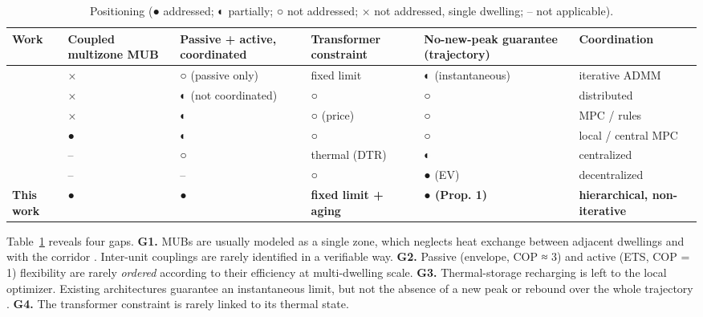 \documentclass[conference]{IEEEtran}
\begin{document}
\begin{table}[tb]
\centering\footnotesize
\caption{Positioning (● addressed; ◐ partially; ○ not addressed; × not addressed, single dwelling; -- not applicable).}\label{tab:I}
\begin{tabular}{>{\raggedright\arraybackslash}p{}>{\raggedright\arraybackslash}p{}>{\raggedright\arraybackslash}p{}>{\raggedright\arraybackslash}p{}>{\raggedright\arraybackslash}p{}>{\raggedright\arraybackslash}p{}}
\toprule
\textbf{Work} & \textbf{Coupled multizone MUB} & \textbf{Passive + active, coordinated} & \textbf{Transformer constraint} & \textbf{No-new-peak guarantee (trajectory)} & \textbf{Coordination} \\
\midrule
\cite{Etedadi2023} & × & ○ (passive only) & fixed limit & ◐ (instantaneous) & iterative ADMM \\
\cite{EtedadiAliabadi2022} & × & ◐ (not coordinated) & ○ & ○ & distributed \\
\cite{Vallianos2023, Morovat2022} & × & ◐ & ○ (price) & ○ & MPC / rules \\
\cite{Frahm2025, Hasrat2025} & ● & ◐ & ○ & ○ & local / central MPC \\
\cite{Daminov2021} & -- & ○ & thermal (DTR) & ◐ & centralized \\
\cite{Gan2013} & -- & -- & ○ & ● (EV) & decentralized \\
\textbf{This work} & \textbf{●} & \textbf{●} & \textbf{fixed limit + aging} & \textbf{● (Prop. 1)} & \textbf{hierarchical, non-iterative} \\
\bottomrule
\end{tabular}
\end{table}

Table~\ref{tab:I} reveals four gaps. \textbf{G1.} MUBs are usually modeled as a single zone, which neglects heat exchange between adjacent dwellings and with the corridor \cite{Cui2023}. Inter-unit couplings are rarely identified in a verifiable way. \textbf{G2.} Passive (envelope, COP ≈ 3) and active (ETS, COP = 1) flexibility are rarely \emph{ordered} according to their efficiency at multi-dwelling scale. \textbf{G3.} Thermal-storage recharging is left to the local optimizer. Existing architectures guarantee an instantaneous limit, but not the absence of a new peak or rebound over the whole trajectory \cite{Hein2026}. \textbf{G4.} The transformer constraint is rarely linked to its thermal state.
\end{document}
